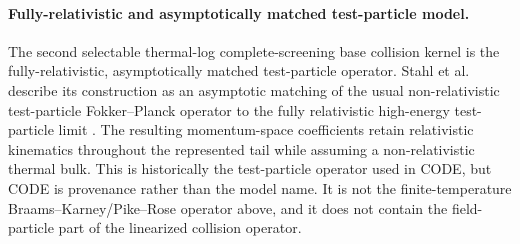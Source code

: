 \documentclass[11pt]{article}
\begin{document}
\paragraph{Fully-relativistic and asymptotically matched test-particle model.}
The second selectable thermal-log complete-screening base collision kernel is the fully-relativistic,
asymptotically matched test-particle operator.  Stahl et al. describe its construction as
an asymptotic matching of the usual non-relativistic test-particle Fokker--Planck
operator to the fully relativistic high-energy test-particle limit
\cite{Stahl2016}.  The resulting momentum-space coefficients retain relativistic
kinematics throughout the represented tail while assuming a non-relativistic thermal
bulk.  This is historically the test-particle operator used in CODE, but CODE is
provenance rather than the model name.  It is not the finite-temperature
Braams--Karney/Pike--Rose operator above, and it does not contain the field-particle part
of the linearized collision operator.
\end{document}
